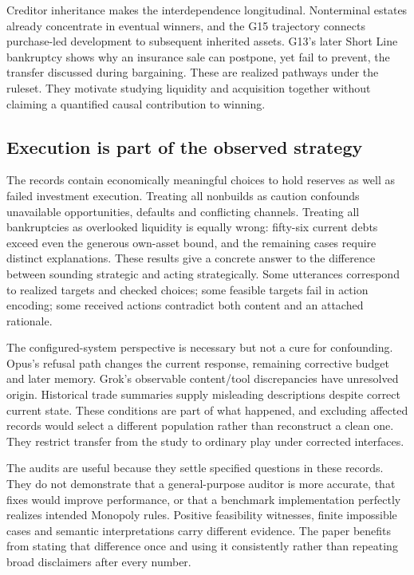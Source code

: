 Creditor inheritance makes the interdependence longitudinal. Nonterminal estates already concentrate in eventual winners, and the G15 trajectory connects purchase-led development to subsequent inherited assets. G13's later Short Line bankruptcy shows why an insurance sale can postpone, yet fail to prevent, the transfer discussed during bargaining. These are realized pathways under the ruleset. They motivate studying liquidity and acquisition together without claiming a quantified causal contribution to winning.

\subsection{Execution is part of the observed strategy}

The records contain economically meaningful choices to hold reserves as well as failed investment execution. Treating all nonbuilds as caution confounds unavailable opportunities, defaults and conflicting channels. Treating all bankruptcies as overlooked liquidity is equally wrong: fifty-six current debts exceed even the generous own-asset bound, and the remaining cases require distinct explanations. These results give a concrete answer to the difference between sounding strategic and acting strategically. Some utterances correspond to realized targets and checked choices; some feasible targets fail in action encoding; some received actions contradict both content and an attached rationale.

The configured-system perspective is necessary but not a cure for confounding. Opus's refusal path changes the current response, remaining corrective budget and later memory. Grok's observable content/tool discrepancies have unresolved origin. Historical trade summaries supply misleading descriptions despite correct current state. These conditions are part of what happened, and excluding affected records would select a different population rather than reconstruct a clean one. They restrict transfer from the study to ordinary play under corrected interfaces.

The audits are useful because they settle specified questions in these records. They do not demonstrate that a general-purpose auditor is more accurate, that fixes would improve performance, or that a benchmark implementation perfectly realizes intended Monopoly rules. Positive feasibility witnesses, finite impossible cases and semantic interpretations carry different evidence. The paper benefits from stating that difference once and using it consistently rather than repeating broad disclaimers after every number.

